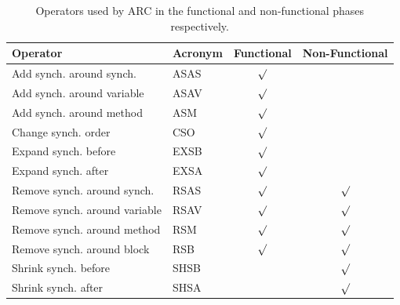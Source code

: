 \documentclass[10pt, conference, compsocconf]{IEEEtran}
\begin{document}
\begin{table}
\begin{center}
\begin{tabular}{|l|l|c|c|}
\hline
\textbf{Operator} &
\textbf{Acronym} &
\textbf{Functional} &
\textbf{Non-Functional}
\\\hline

Add synch. around synch. & ASAS & $\surd$ &
\\\hline

Add synch. around variable & ASAV & $\surd$ &
\\\hline

Add synch. around method & ASM & $\surd$ &
\\\hline

Change synch. order & CSO & $\surd$ &
\\\hline

Expand synch. before & EXSB & $\surd$ &
\\\hline

Expand synch. after & EXSA & $\surd$ &
\\\hline

Remove synch. around synch. & RSAS & $\surd$ & $\surd$
\\\hline

Remove synch. around variable & RSAV & $\surd$ & $\surd$
\\\hline

Remove synch. around method & RSM & $\surd$ & $\surd$
\\\hline

Remove synch. around block & RSB & $\surd$ & $\surd$
\\\hline

Shrink synch. before & SHSB & & $\surd$
\\\hline

Shrink synch. after & SHSA & & $\surd$
\\\hline

\end{tabular}
\caption{Operators used by ARC in the functional and non-functional phases respectively.}
\label{tbl:operators}
\end{center}
\end{table}
\end{document}
